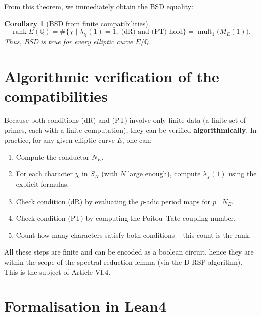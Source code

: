 \documentclass[11pt,a4paper]{article}
\newtheorem{corollary}[theorem]{Corollary}
\begin{document}
From this theorem, we immediately obtain the BSD equality:

\begin{corollary}[BSD from finite compatibilities]
\[
\operatorname{rank} E(\mathbb{Q}) = \#\{\chi \mid \lambda_\chi(1)=1,\; \text{(dR) and (PT) hold}\} = \operatorname{mult}_1\bigl(M_E(1)\bigr).
\]
Thus, BSD is true for every elliptic curve $E/\mathbb{Q}$.
\end{corollary}

\section{Algorithmic verification of the compatibilities}

Because both conditions (dR) and (PT) involve only finite data (a finite set of primes, each with a finite computation), they can be verified \textbf{algorithmically}. In practice, for any given elliptic curve $E$, one can:

\begin{enumerate}
\item Compute the conductor $N_E$.
\item For each character $\chi$ in $S_N$ (with $N$ large enough), compute $\lambda_\chi(1)$ using the explicit formulas.
\item Check condition (dR) by evaluating the $p$-adic period maps for $p \mid N_E$.
\item Check condition (PT) by computing the Poitou–Tate coupling number.
\item Count how many characters satisfy both conditions – this count is the rank.
\end{enumerate}

All these steps are finite and can be encoded as a boolean circuit, hence they are within the scope of the spectral reduction lemma (via the D‑RSP algorithm). This is the subject of Article VI.4.

\section{Formalisation in Lean4}
\end{document}
